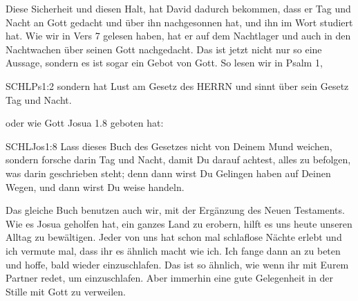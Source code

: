 \documentclass[14pt]{../../inc/mybib}
\begin{document}
    \begin{block}
        Diese Sicherheit und diesen Halt, hat David dadurch bekommen, dass er Tag und Nacht an Gott gedacht und über ihn nachgesonnen hat, und ihn im Wort studiert hat. Wie wir in Vers 7 gelesen haben, hat er auf dem Nachtlager und auch in den Nachtwachen über seinen Gott nachgedacht. Das ist jetzt nicht nur so eine Aussage, sondern es ist sogar ein Gebot von Gott. So lesen wir in Psalm 1,
        \begin{bibelbox}{SCHL}{Ps}{1:2}
            sondern hat Lust am Gesetz des HERRN und sinnt über sein Gesetz Tag und Nacht.
        \end{bibelbox}
        oder wie Gott Josua 1.8 geboten hat:
        \begin{bibelbox}{SCHL}{Jos}{1:8}
            Lass dieses Buch des Gesetzes nicht von Deinem Mund weichen, sondern forsche darin Tag und Nacht, damit Du darauf achtest, alles zu befolgen, was darin geschrieben steht; denn dann wirst Du Gelingen haben auf Deinen Wegen, und dann wirst Du weise handeln.
        \end{bibelbox}
        Das gleiche Buch benutzen auch wir, mit der Ergänzung des Neuen Testaments. Wie es Josua geholfen hat, ein ganzes Land zu erobern, hilft es uns heute unseren Alltag zu bewältigen.
        Jeder von uns hat schon mal schlaflose Nächte erlebt und ich vermute mal, dass ihr es ähnlich macht wie ich. Ich fange dann an zu beten und hoffe, bald wieder einzuschlafen. Das ist so ähnlich, wie wenn ihr mit Eurem Partner redet, um einzuschlafen. Aber immerhin eine gute Gelegenheit in der Stille mit Gott zu verweilen.
    \end{block}   
\end{document}

